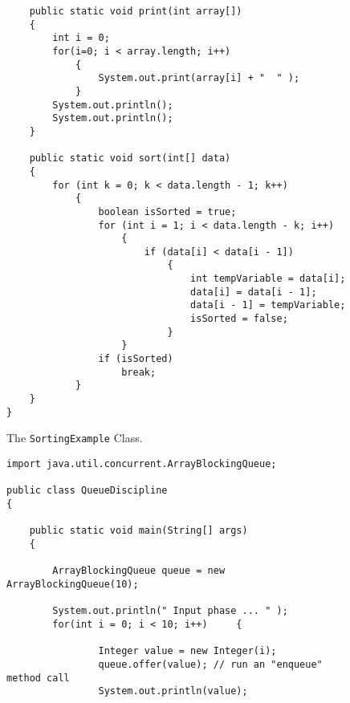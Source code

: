 \documentclass[12pt]{article}
\begin{document}
\begin{enumerate}
\begin{figure}[t]
{\begin{verbatim}
    public static void print(int array[])
    {
        int i = 0;
        for(i=0; i < array.length; i++)
            {
                System.out.print(array[i] + "  " );
            }
        System.out.println();
        System.out.println();
    }

    public static void sort(int[] data)
    {
        for (int k = 0; k < data.length - 1; k++)
            {
                boolean isSorted = true;
                for (int i = 1; i < data.length - k; i++)
                    {
                        if (data[i] < data[i - 1])
                            {
                                int tempVariable = data[i];
                                data[i] = data[i - 1];
                                data[i - 1] = tempVariable;
                                isSorted = false;
                            }
                    }
                if (isSorted)
                    break;
            }
    }
}
\end{verbatim}
}

\caption{The {\tt SortingExample} Class.}
\label{SortingExample}
\end{figure}

%
%
%
%
%

\newpage

\begin{figure}[t]

\footnotesize{
\begin{verbatim}
import java.util.concurrent.ArrayBlockingQueue;

public class QueueDiscipline
{

    public static void main(String[] args)
    {

        ArrayBlockingQueue queue = new ArrayBlockingQueue(10);

        System.out.println(" Input phase ... " );
        for(int i = 0; i < 10; i++)	    {

                Integer value = new Integer(i);
                queue.offer(value); // run an "enqueue" method call
                System.out.println(value);


\end{verbatim}}
\end{figure}
\end{enumerate}
\end{document}
